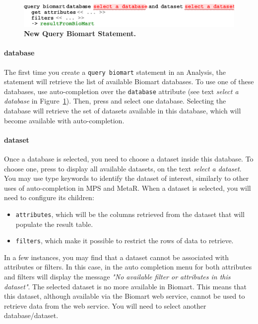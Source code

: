  \begin{figure}[h!tbp]
  \centering
  \includegraphics[width=\figWidthWide]{figures/NewBiomart.pdf}
\caption[New Query Biomart Statement.]{\textbf{New Query Biomart Statement.}}
\label{fig:NewBiomart}
\end{figure}


\paragraph{database}
The first time you create a \texttt{query biomart} statement in an Analysis, the statement will retrieve the list of available Biomart databases. To use one of these databases, use auto-completion over the \texttt{database} attribute (see  text \textit{select a database} in Figure~\ref{fig:NewBiomart}). Then, press \keys{\ctrl+\space} and select one database. Selecting the database will retrieve the set of datasets available in this database, which will become available with auto-completion.


 \paragraph{dataset} 
Once a database is selected, you need to choose a dataset inside this database. To choose one, press \keys{\ctrl+\space} to display all available datasets, on the text \textit{select a dataset}. You may use type keywords to identify the dataset of interest, similarly to other uses of auto-completion in MPS and MetaR. When a dataset is selected, you will need to configure its children:
\begin{itemize}

\item \texttt{attributes}, which will be the columns retrieved from the dataset that will populate the result table.
\item \texttt{filters}, which make it possible  to restrict the rows of data to retrieve.
\end{itemize}

\begin{remark}
In a few instances, you may find that a dataset cannot be associated with attributes or filters. In this case, in the auto completion menu for both attributes and filters will display the message \textit{"No available filter or attributes in this dataset"}. The selected dataset is no more available in Biomart. This means that this dataset, although available via the Biomart web service, cannot be used to retrieve data from the web service. You will need to select another database/dataset. 
\end{remark}

